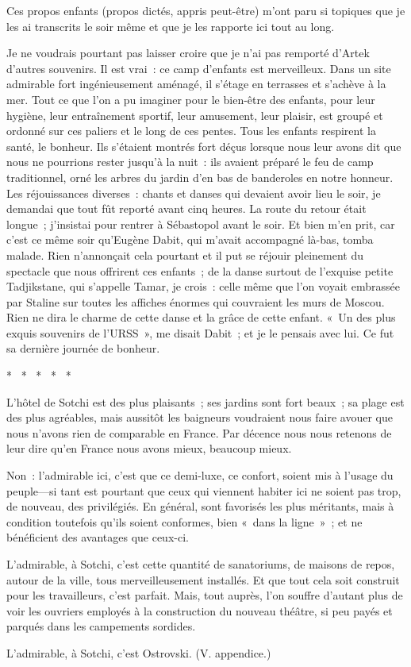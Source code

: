 \documentclass[french,twoside]{book} %
\begin{document}
Ces propos enfants (propos dictés, appris peut-être) m’ont paru si topiques que je les ai transcrits le soir même et que je les rapporte ici tout au long.\par
Je ne voudrais pourtant pas laisser croire que je n’ai pas remporté d’Artek d’autres souvenirs. Il est vrai : ce camp d’enfants est merveilleux. Dans un site admirable fort ingénieusement aménagé, il s’étage en terrasses et s’achève à la mer. Tout ce que l’on a pu imaginer pour le bien-être des enfants, pour leur hygiène, leur entraînement sportif, leur amusement, leur plaisir, est groupé et ordonné sur ces paliers et le long de ces pentes. Tous les enfants respirent la santé, le bonheur. Ils s’étaient montrés fort déçus lorsque nous leur avons dit que nous ne pourrions rester jusqu’à la nuit : ils avaient préparé le feu de camp traditionnel, orné les arbres du jardin d’en bas de banderoles en notre honneur. Les réjouissances diverses : chants et danses qui devaient avoir lieu le soir, je demandai que tout fût reporté avant cinq heures. La route du retour était longue ; j’insistai pour rentrer à Sébastopol avant le soir. Et bien m’en prit, car c’est ce même soir qu’Eugène Dabit, qui m’avait accompagné là-bas, tomba malade. Rien n’annonçait cela pourtant et il put se réjouir pleinement du spectacle que nous offrirent ces enfants ; de la danse surtout de l’exquise petite Tadjikstane, qui s’appelle Tamar, je crois : celle même que l’on voyait embrassée par Staline sur toutes les affiches énormes qui couvraient les murs de Moscou. Rien ne dira le charme de cette danse et la grâce de cette enfant. « Un des plus exquis souvenirs de l’URSS », me disait Dabit ; et je le pensais avec lui. Ce fut sa dernière journée de bonheur.\par
\bigbreak

\begin{center}
\noindent \centerline{*  *  *  *  *}\par
\end{center}

\bigbreak
\noindent L’hôtel de Sotchi est des plus plaisants ; ses jardins sont fort beaux ; sa plage est des plus agréables, mais aussitôt les baigneurs voudraient nous faire avouer que nous n’avons rien de comparable en France. Par décence nous nous retenons de leur dire qu’en France nous avons mieux, beaucoup mieux.\par
Non : l’admirable ici, c’est que ce demi-luxe, ce confort, soient mis à l’usage du peuple—si tant est pourtant que ceux qui viennent habiter ici ne soient pas trop, de nouveau, des privilégiés. En général, sont favorisés les plus méritants, mais à condition toutefois qu’ils soient conformes, bien « dans la ligne » ; et ne bénéficient des avantages que ceux-ci.\par
L’admirable, à Sotchi, c’est cette quantité de sanatoriums, de maisons de repos, autour de la ville, tous merveilleusement installés. Et que tout cela soit construit pour les travailleurs, c’est parfait. Mais, tout auprès, l’on souffre d’autant plus de voir les ouvriers employés à la construction du nouveau théâtre, si peu payés et parqués dans les campements sordides.\par
L’admirable, à Sotchi, c’est Ostrovski. (V. appendice.)\par
\end{document}
